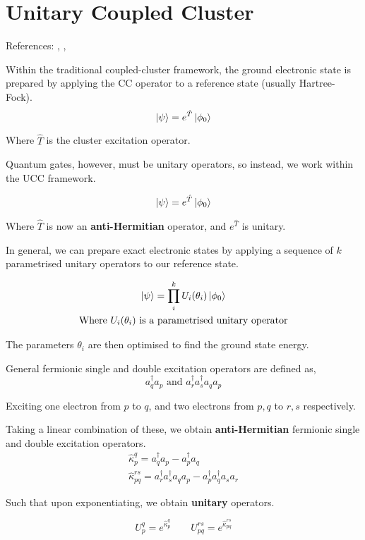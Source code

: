 \section{Unitary Coupled Cluster}
References: \cite{Anand2021}, \cite{McClean2016}, \cite{Chan2021}

Within the traditional coupled-cluster framework, the ground electronic state is prepared by applying the CC operator to a reference state (usually Hartree-Fock).
\begin{equation*}
    \ket\psi = e^{\hat T} \ket{\phi_0}
\end{equation*}

Where $\hat T$ is the cluster excitation operator.

Quantum gates, however, must be unitary operators, so instead, we work within the UCC framework.

\begin{equation*}
    \ket\psi = e^{\hat T} \ket{\phi_0}
\end{equation*}

Where $\hat T$ is now an \textbf{anti-Hermitian} operator, and $e^{\hat T}$ is unitary.

In general, we can prepare exact electronic states by applying a sequence of $k$ parametrised unitary operators to our reference state.

\begin{equation*}
\begin{gathered}
    \ket\psi = \prod_i^k U_i(\theta_i) \ket{\phi_0} \\
    \text{Where $U_i(\theta_i)$ is a parametrised unitary operator}
\end{gathered}
\end{equation*}\smallskip

The parameters $\theta_i$ are then optimised to find the ground state energy.

General fermionic single and double excitation operators are defined as,
\begin{equation*}
    a_q^\dagger a_p \text{ and } a_r^\dagger a_s^\dagger a_q a_p
\end{equation*}

Exciting one electron from $p$ to $q$, and two electrons from $p, q$ to $r, s$ respectively.

Taking a linear combination of these, we obtain \textbf{anti-Hermitian} fermionic single and double excitation operators.
\begin{equation*}
\begin{gathered}
    \hat\kappa_p^q = a_q^\dagger a_p - a_p^\dagger a_q \\
    \hat\kappa_{pq}^{rs} =
    a_r^\dagger a_s^\dagger a_q a_p - a_p^\dagger a_q^\dagger a_s a_r
\end{gathered}
\end{equation*}\smallskip

Such that upon exponentiating, we obtain \textbf{unitary} operators.

\begin{equation*}
    U^q_p = e^{\hat\kappa_p^q} \qquad
    U_{pq}^{rs} = e^{\hat\kappa_{pq}^{rs}}
\end{equation*}

